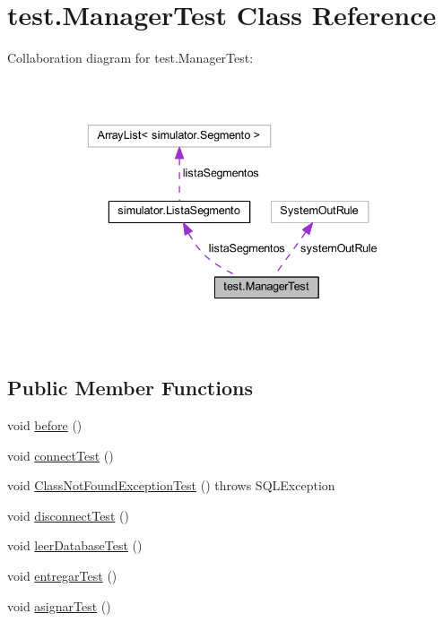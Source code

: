 \hypertarget{classtest_1_1_manager_test}{}\section{test.\+Manager\+Test Class Reference}
\label{classtest_1_1_manager_test}


Collaboration diagram for test.\+Manager\+Test\+:\nopagebreak
\begin{figure}[H]
\begin{center}
\leavevmode
\includegraphics[width=336pt]{classtest_1_1_manager_test__coll__graph}
\end{center}
\end{figure}
\subsection*{Public Member Functions}
\begin{DoxyCompactItemize}
\item 
void \mbox{\hyperlink{classtest_1_1_manager_test_ad710f9a15cc2d2f6aaeb827b25cbd1d2}{before}} ()
\item 
void \mbox{\hyperlink{classtest_1_1_manager_test_a7b2f9075ed25eb6389bb263099a75c1c}{connect\+Test}} ()
\item 
void \mbox{\hyperlink{classtest_1_1_manager_test_a85a4be4f4bd5606a127e983fa4e3883d}{Class\+Not\+Found\+Exception\+Test}} ()  throws S\+Q\+L\+Exception
\item 
void \mbox{\hyperlink{classtest_1_1_manager_test_af4a31042b6841a262fa71d6da2c24279}{disconnect\+Test}} ()
\item 
void \mbox{\hyperlink{classtest_1_1_manager_test_ac84a6778c74c43fc017ab5297f94584e}{leer\+Database\+Test}} ()
\item 
void \mbox{\hyperlink{classtest_1_1_manager_test_a38faaaeb2a9599c4efdc76b6d7b36a96}{entregar\+Test}} ()
\item 
void \mbox{\hyperlink{classtest_1_1_manager_test_ab470b5d3e7f291fa187e1c737d782b34}{asignar\+Test}} ()
\end{DoxyCompactItemize}
